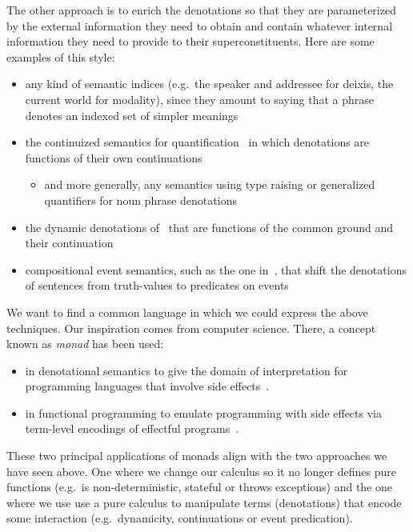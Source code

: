 \documentclass{llncs}
\begin{document}
The other approach is to enrich the denotations so that they are
parameterized by the external information they need to obtain and contain
whatever internal information they need to provide to their
superconstituents. Here are some examples of this style:

\begin{itemize}
\item any kind of semantic indices (e.g.\ the speaker and addressee for
  deixis, the current world for modality), since they amount to saying that
  a phrase denotes an indexed set of simpler meanings
\item the continuized semantics for
  quantification~\cite{barker2002continuations} in which denotations are
  functions of their own continuations
  \begin{itemize}
  \item and more generally, any semantics using type raising or generalized
    quantifiers for noun phrase denotations
  \end{itemize}
\item the dynamic denotations of~\cite{de2006towards} that are functions of
  the common ground and their continuation
\item compositional event semantics, such as the one
  in~\cite{qian2011event}, that shift the denotations of sentences from
  truth-values to predicates on events
\end{itemize}

We want to find a common language in which we could express the above
techniques. Our inspiration comes from computer science. There, a concept
known as \emph{monad} has been used:
\begin{itemize}
\item in denotational semantics to give the domain of interpretation for
  programming languages that involve side effects~\cite{moggi1991notions}.
\item in functional programming to emulate programming with side effects
  via term-level encodings of effectful programs~\cite{wadler1992essence}.
\end{itemize}
These two principal applications of monads align with the two approaches we
have seen above. One where we change our calculus so it no longer defines
pure functions (e.g.\ is non-deterministic, stateful or throws exceptions)
and the one where we use use a pure calculus to manipulate terms
(denotations) that encode some interaction (e.g.\ dynamicity, continuations
or event predication).
\end{document}
